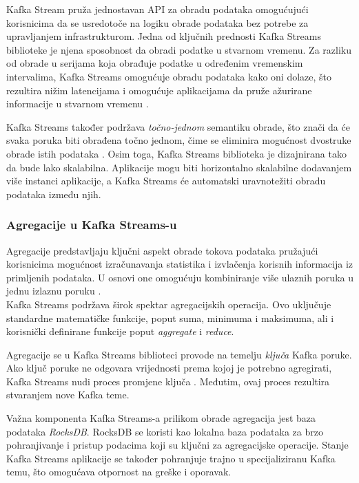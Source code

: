 \documentclass[times, utf8, diplomski]{fer}
\begin{document}
Kafka Stream pruža jednostavan API za obradu podataka omogućujući korisnicima da se usredotoče na logiku obrade podataka bez potrebe za upravljanjem infrastrukturom. Jedna od ključnih prednosti Kafka Streams biblioteke je njena sposobnost da obradi podatke u stvarnom vremenu. 
Za razliku od obrade u serijama  koja obrađuje podatke u određenim vremenskim intervalima, Kafka Streams omogućuje obradu podataka kako oni dolaze, što rezultira nižim latencijama i omogućuje aplikacijama da pruže ažurirane informacije u stvarnom vremenu \citep{seymour_mastering_2021}.

Kafka Streams također podržava \emph{\glqq točno-jednom\grqq} semantiku obrade, što znači da će svaka poruka biti obrađena točno jednom, čime se eliminira mogućnost dvostruke obrade istih podataka \citep{narkhede_exactly-once_2017}.
Osim toga, Kafka Streams biblioteka je dizajnirana tako da bude lako skalabilna. Aplikacije mogu biti horizontalno skalabilne dodavanjem više instanci aplikacije, a Kafka Streams će automatski uravnotežiti obradu podataka između njih.

\subsubsection{Agregacije u Kafka Streams-u}

Agregacije predstavljaju ključni aspekt obrade tokova podataka pružajući korisnicima mogućnost izračunavanja statistika i izvlačenja korisnih informacija iz primljenih podataka. U osnovi one omogućuju kombiniranje više ulaznih poruka u jednu izlaznu poruku \citep{seymour_mastering_2021}.\\

Kafka Streams podržava širok spektar agregacijskih operacija. Ovo uključuje standardne matematičke funkcije, poput suma, minimuma i maksimuma, ali i korisnički definirane funkcije poput \emph{aggregate} i \emph{reduce}.

Agregacije se u Kafka Streams biblioteci provode na temelju \emph{ključa} Kafka poruke. Ako ključ poruke ne odgovara vrijednosti prema kojoj je potrebno agregirati, Kafka Streams nudi proces promjene ključa . Međutim, ovaj proces rezultira stvaranjem nove Kafka teme.

Važna komponenta Kafka Streams-a prilikom obrade agregacija jest baza podataka \emph{RocksDB}. RocksDB se koristi kao lokalna baza podataka za brzo pohranjivanje i pristup podacima koji su ključni za agregacijske operacije. Stanje Kafka Streams aplikacije se također pohranjuje trajno u specijaliziranu Kafka temu, što omogućava otpornost na greške i oporavak.\\
\end{document}

